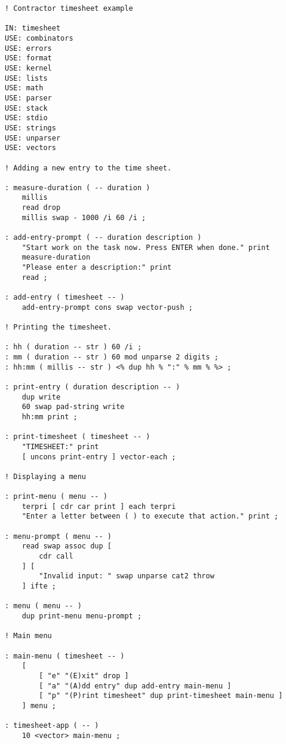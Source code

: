 \documentclass[english]{book}
\begin{document}
\begin{verbatim}
! Contractor timesheet example

IN: timesheet
USE: combinators
USE: errors
USE: format
USE: kernel
USE: lists
USE: math
USE: parser
USE: stack
USE: stdio
USE: strings
USE: unparser
USE: vectors

! Adding a new entry to the time sheet.

: measure-duration ( -- duration )
    millis
    read drop
    millis swap - 1000 /i 60 /i ;

: add-entry-prompt ( -- duration description )
    "Start work on the task now. Press ENTER when done." print
    measure-duration
    "Please enter a description:" print
    read ;

: add-entry ( timesheet -- )
    add-entry-prompt cons swap vector-push ;

! Printing the timesheet.

: hh ( duration -- str ) 60 /i ;
: mm ( duration -- str ) 60 mod unparse 2 digits ;
: hh:mm ( millis -- str ) <% dup hh % ":" % mm % %> ;

: print-entry ( duration description -- )
    dup write
    60 swap pad-string write
    hh:mm print ;

: print-timesheet ( timesheet -- )
    "TIMESHEET:" print
    [ uncons print-entry ] vector-each ;

! Displaying a menu

: print-menu ( menu -- )
    terpri [ cdr car print ] each terpri
    "Enter a letter between ( ) to execute that action." print ;

: menu-prompt ( menu -- )
    read swap assoc dup [
        cdr call
    ] [
        "Invalid input: " swap unparse cat2 throw
    ] ifte ;

: menu ( menu -- )
    dup print-menu menu-prompt ;

! Main menu

: main-menu ( timesheet -- )
    [
        [ "e" "(E)xit" drop ]
        [ "a" "(A)dd entry" dup add-entry main-menu ]
        [ "p" "(P)rint timesheet" dup print-timesheet main-menu ]
    ] menu ;

: timesheet-app ( -- )
    10 <vector> main-menu ;
\end{verbatim}


\end{document}
